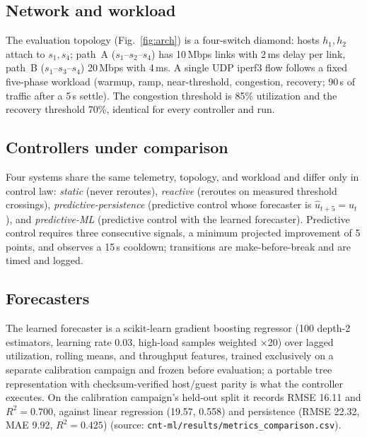 \documentclass[conference]{IEEEtran}
\begin{document}
\subsection{Network and workload}
The evaluation topology (Fig.~\ref{fig:arch}) is a four-switch diamond:
hosts $h_1, h_2$ attach to $s_1, s_4$; path~A ($s_1$--$s_2$--$s_4$)
has 10\,Mbps links with 2\,ms delay per link, path~B
($s_1$--$s_3$--$s_4$) 20\,Mbps with 4\,ms. A single UDP iperf3 flow
follows a fixed five-phase workload (warmup, ramp, near-threshold,
congestion, recovery; 90\,s of traffic after a 5\,s settle). The
congestion threshold is 85\% utilization and the recovery threshold
70\%, identical for every controller and run.

\subsection{Controllers under comparison}
Four systems share the same telemetry, topology, and workload and
differ only in control law: \emph{static} (never reroutes),
\emph{reactive} (reroutes on measured threshold crossings),
\emph{predictive-persistence} (predictive control whose forecaster is
$\hat{u}_{t+5} = u_t$), and \emph{predictive-ML} (predictive control
with the learned forecaster). Predictive control requires three
consecutive signals, a minimum projected improvement of 5 points, and
observes a 15\,s cooldown; transitions are make-before-break and are
timed and logged.

\subsection{Forecasters}
The learned forecaster is a scikit-learn gradient boosting regressor
(100 depth-2 estimators, learning rate 0.03, high-load samples
weighted $\times$20) over lagged utilization, rolling means, and
throughput features, trained exclusively on a separate calibration
campaign and frozen before evaluation; a portable tree representation
with checksum-verified host/guest parity is what the controller
executes. On the calibration campaign's held-out split it records
RMSE 16.11 and $R^2 = 0.700$, against linear regression (19.57,
0.558) and persistence (RMSE 22.32, MAE 9.92, $R^2 = 0.425$)
(source: \texttt{cnt-ml/results/metrics\_comparison.csv}).
\end{document}
